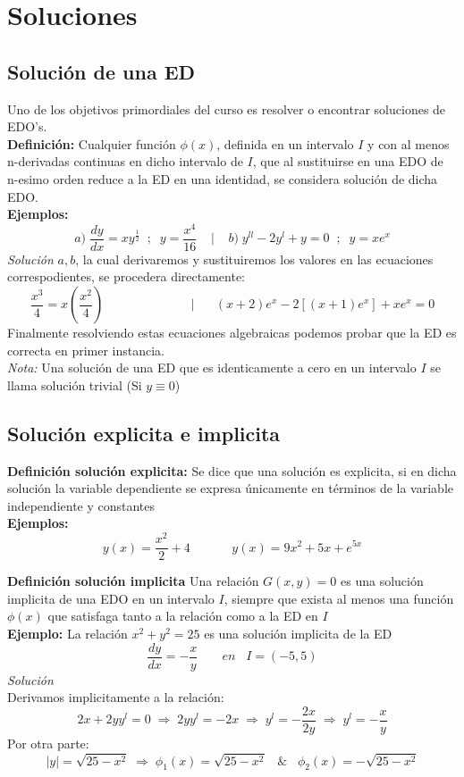 \documentclass[10pt,executivepaper]{article}
\begin{document}
\section{Soluciones}
\subsection{Solución de una ED}
Uno de los objetivos primordiales del curso es resolver o encontrar soluciones de EDO's.\\
\textbf{Definición:} Cualquier función $\phi(x)$, definida en un intervalo $I$ y con al menos n-derivadas continuas en dicho intervalo de $I$, que al sustituirse en una EDO de n-esimo orden reduce a la ED en una identidad, se considera solución de dicha EDO.
\\\textbf{Ejemplos:}
\[a)\;\frac{dy}{dx}=xy^{\frac{1}{2}}\;\;;\;\;y=\frac{x^{4}}{16}\;\;\;\;|\;\;\;\;b)\;y^{ll}-2y^{l}+y=0\;\;;\;\;y=xe^{x}\]
\textit{Solución} $a,b$, la cual derivaremos y sustituiremos los valores en las ecuaciones correspodientes, se procedera directamente:
\[\frac{x^{3}}{4}=x\left(\frac{x^{2}}{4}\right)\;\;\;\;\;\;\;\;\;\;\;\;\;\;\;\;\;\;\;\;\;\;\;\;\;|\;\;\;\;\;\;(x+2)e^{x}-2[(x+1)e^{x}]+xe^{x}=0\]
Finalmente resolviendo estas ecuaciones algebraicas podemos probar que la ED es correcta en primer instancia.\\
\textit{Nota:} Una solución de una ED que es identicamente a cero en un intervalo $I$ se llama solución trivial (Si $y\equiv0$)

\subsection{Solución explicita e implicita}
\textbf{Definición solución explicita:} Se dice que una solución es explicita, si en dicha solución la variable dependiente se expresa únicamente en términos de la variable independiente y constantes
\\\textbf{Ejemplos:}
\[y(x)=\frac{x^{2}}{2}+4\;\;\;\;\;\;\;\;\;\;\;\;y(x)=9x^{2}+5x+e^{5x}\]

\textbf{Definición solución implicita} Una relación $G(x,y)=0$ es una solución implicita de una EDO en un intervalo $I$, siempre que exista al menos una función $\phi(x)$ que satisfaga tanto a la relación como  a la ED en $I$
\\\textbf{Ejemplo:}
La relación $x^{2}+y^{2}=25$ es una solución implicita de la ED
\[\frac{dy}{dx}=-\frac{x}{y}\;\;\;\;\;\;\;en\;\;\;I=(-5,5)\]
\textit{Solución}\\
Derivamos implicitamente a la relación:
\[2x+2yy^{l}=0 \;\Rightarrow\; 2yy^{l}=-2x \;\Rightarrow\; y^{l}=-\frac{2x}{2y}\;\Rightarrow\; y^{l}=-\frac{x}{y}\]
Por otra parte:
\[\left|y\right|=\sqrt{25-x^{2}}\;\Rightarrow\;\phi_{1}(x)=\sqrt{25-x^{2}}\;\;\;\&\;\;\;\phi_{2}(x)=-\sqrt{25-x^{2}}\]

\printindex
\end{document}
